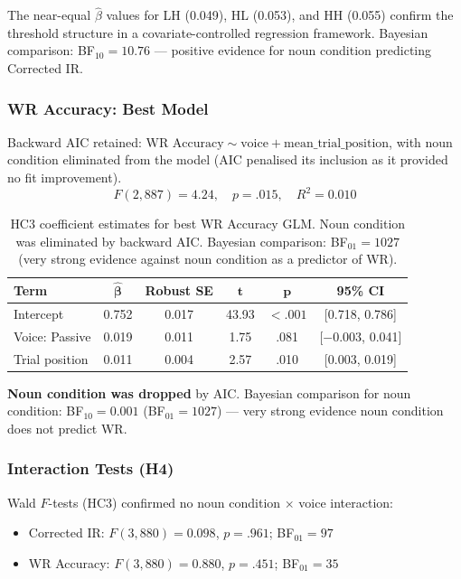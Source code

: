 \documentclass[12pt, a4paper]{article}
\begin{document}
The near-equal $\hat{\beta}$ values for LH (0.049), HL (0.053), and HH
(0.055) confirm the threshold structure in a covariate-controlled
regression framework. Bayesian comparison: BF$_{10} = 10.76$ --- positive
evidence for noun condition predicting Corrected IR.

\subsubsection{WR Accuracy: Best Model}

Backward AIC retained: $\text{WR Accuracy} \sim \text{voice} +
\text{mean\_trial\_position}$, with noun condition eliminated from the
model (AIC penalised its inclusion as it provided no fit improvement).
\[
  F(2, 887) = 4.24,\quad p = .015,\quad R^2 = 0.010
\]

\begin{table}[htbp]
  \centering\small
  \begin{tabular}{lccccc}
    \toprule
    \textbf{Term} & $\boldsymbol{\hat{\beta}}$ & \textbf{Robust SE} &
    $\boldsymbol{t}$ & $\boldsymbol{p}$ & \textbf{95\% CI} \\
    \midrule
    Intercept      & 0.752 & 0.017 & 43.93 & $<.001$ & [0.718, 0.786] \\
    Voice: Passive & 0.019 & 0.011 &  1.75 & .081    & [$-$0.003, 0.041] \\
    Trial position & 0.011 & 0.004 &  2.57 & .010    & [0.003, 0.019] \\
    \bottomrule
  \end{tabular}
  \caption{HC3 coefficient estimates for best WR Accuracy GLM.
  Noun condition was eliminated by backward AIC.
  Bayesian comparison: BF$_{01} = 1027$ (very strong evidence against
  noun condition as a predictor of WR).}
  \label{tab:glm_wr}
\end{table}

\textbf{Noun condition was dropped} by AIC. Bayesian comparison for
noun condition: BF$_{10} = 0.001$ (BF$_{01} = 1027$) --- very strong
evidence noun condition does not predict WR.

\subsubsection{Interaction Tests (H4)}

Wald $F$-tests (HC3) confirmed no noun condition $\times$ voice interaction:
\begin{itemize}[noitemsep]
  \item Corrected IR: $F(3, 880) = 0.098$, $p = .961$;
  BF$_{01} = 97$
  \item WR Accuracy: $F(3, 880) = 0.880$, $p = .451$;
  BF$_{01} = 35$
\end{itemize}
\end{document}
